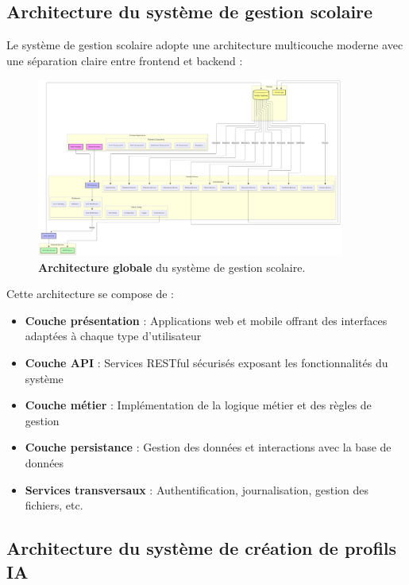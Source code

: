\subsection{Architecture du système de gestion scolaire}

Le système de gestion scolaire adopte une architecture multicouche moderne avec une séparation claire entre frontend et backend :

\begin{figure}[H]
  \centering
  \includegraphics[width=0.9\textwidth,keepaspectratio]{pfe-pics/diagrames/archetecture.png}
  \caption{\textbf{Architecture globale} du système de gestion scolaire.}
  \label{fig:school_architecture}
\end{figure}

Cette architecture se compose de :

\begin{itemize}
  \item \textbf{Couche présentation} : Applications web et mobile offrant des interfaces adaptées à chaque type d'utilisateur
  
  \item \textbf{Couche API} : Services RESTful sécurisés exposant les fonctionnalités du système
  
  \item \textbf{Couche métier} : Implémentation de la logique métier et des règles de gestion
  
  \item \textbf{Couche persistance} : Gestion des données et interactions avec la base de données
  
  \item \textbf{Services transversaux} : Authentification, journalisation, gestion des fichiers, etc.
\end{itemize}

\subsection{Architecture du système de création de profils IA}

